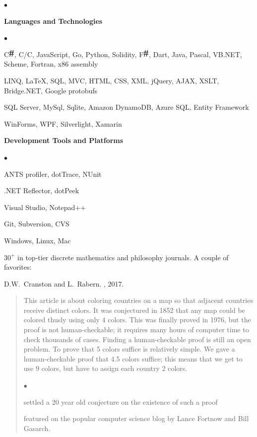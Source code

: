 \documentclass[10pt]{article}
\def\CC{{C\nolinebreak[4]\hspace{-.05em}\raisebox{.4ex}{\tiny\bf ++}}}
\newcommand{\CS}{C\includegraphics{sharp}}
\newcommand{\FS}{F\includegraphics{sharp}}
\newcommand{\resheading}[1]{
  \parbox{\textwidth}{
    \begin{shaded}
      \textbf{\sffamily{\mbox{~}{\large #1}}}
    \end{shaded}
  }
}
\newcommand{\squishlist}{
   \begin{list}{$\bullet$}
    { \setlength{\itemsep}{0pt}    \setlength{\parsep}{0pt}
      \setlength{\topsep}{4.5pt}     \setlength{\partopsep}{0pt}
      \setlength{\leftmargin}{2em} \setlength{\labelwidth}{1.5em}
      \setlength{\labelsep}{0.5em} } }
\newcommand{\squishend}{
    \end{list}  }
\begin{document}
\resheading{Technical Skills}
\squishlist
    \item \textbf{Languages and Technologies}
    \squishlist
        \item \CS{}, C/\CC{}, JavaScript, Go, Python, Solidity, \FS{}, Dart, Java, Pascal, VB.NET, Scheme, Fortran, x86 assembly
        \item LINQ, \LaTeX, SQL, MVC, HTML, CSS, XML, jQuery, AJAX, XSLT, Bridge.NET, Google protobufs
		\item SQL Server, MySql, Sqlite, Amazon DynamoDB, Azure SQL, Entity Framework
        \item WinForms, WPF, Silverlight, Xamarin
    \squishend
    
    \item \textbf{Development Tools and Platforms}
    \squishlist
		\item ANTS profiler, dotTrace, NUnit
  	    \item .NET Reflector, dotPeek
        \item Visual Studio, Notepad++
        \item Git, Subversion, CVS
        \item Windows, Linux, Mac
      \squishend
\squishend
\newpage
\resheading{Research Articles}
{\large$30^+$ \href{https://sites.google.com/site/landonrabern/research-articles}{\color{blue}{publications}} in top-tier discrete mathematics and philosophy journals.  
A couple of favorites:}

\vspace{0.25in}
{\large
D.W.~Cranston and L.~Rabern.
\newblock \href{https://landon.github.io/graphdata/Papers/planar%209%20halves.pdf}{\color{blue}{Planar graphs are $\frac92$-colorable}}
, 2017.}

\begin{quote}
This article is about coloring countries on a map so that adjacent countries receive distinct colors.  It was conjectured
in 1852 that any map could be colored thusly using only 4 colors.  This was finally proved in 1976, but the proof is not human-checkable;
it requires many hours of computer time to check thousands of cases.  Finding a human-checkable proof is still an open problem.
To prove that 5 colors suffice is relatively simple.  We gave a human-checkable proof that 4.5 colors suffice; this means that
we get to use 9 colors, but have to assign each country 2 colors.

\squishlist
\item settled a 20 year old conjecture on the existence of such a proof
\item featured on the popular computer science blog 
\href{http://blog.computationalcomplexity.org/2015/10/a-human-readable-proof-that-every.html}{\color{blue}{Computational Complexity}} by Lance Fortnow
and Bill Gasarch.
\squishend
\end{quote}
\end{document}
